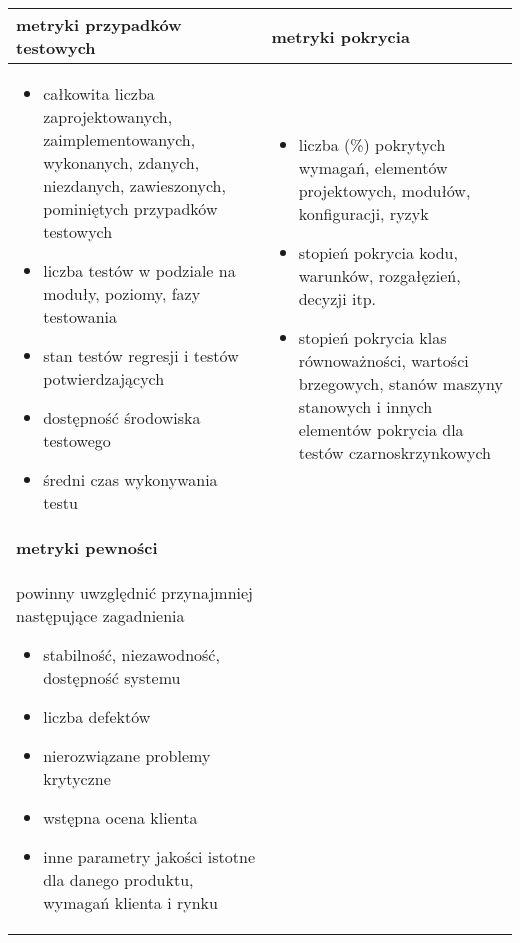 \documentclass[../main.tex]{subfiles}
\begin{document}
    \begin{table}[H]
        \begin{center}
            \begin{tabular}{| p{8cm} | p{8cm} |}
                \hline
                \textbf{metryki przypadków testowych} & \textbf{metryki pokrycia}\\
                \hline
                \begin{itemize}
                    \item całkowita liczba zaprojektowanych, zaimplementowanych, wykonanych, zdanych, niezdanych, zawieszonych, pominiętych przypadków testowych
                    \item liczba testów w podziale na moduły, poziomy, fazy testowania
                    \item stan testów regresji i testów potwierdzających
                    \item dostępność środowiska testowego
                    \item średni czas wykonywania testu
                \end{itemize}
                &
                \begin{itemize}
                    \item liczba (\%) pokrytych wymagań, elementów projektowych, modułów, konfiguracji, ryzyk
                    \item stopień pokrycia kodu, warunków, rozgałęzień, decyzji itp.
                    \item stopień pokrycia klas równoważności, wartości brzegowych, stanów maszyny stanowych i innych elementów pokrycia dla testów czarnoskrzynkowych
                \end{itemize}\\
                \hline
                \hline
                \textbf{metryki pewności} &\\
                \hline
                powinny uwzględnić przynajmniej następujące zagadnienia
                \begin{itemize}
                    \item stabilność, niezawodność, dostępność systemu
                    \item liczba defektów
                    \item nierozwiązane problemy krytyczne
                    \item wstępna ocena klienta
                    \item inne parametry jakości istotne dla danego produktu, wymagań klienta i rynku
                \end{itemize} &\\
                \hline
            \end{tabular}
        \end{center}
    \end{table}
\end{document}
